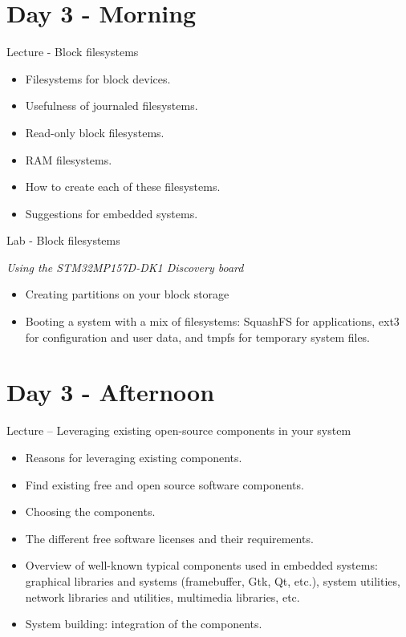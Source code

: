 \documentclass[a4paper,12pt,obeyspaces,spaces,hyphens]{article}
\begin{document}
\section{Day 3 - Morning}

\feagendatwocolumn
{Lecture - Block filesystems}
{
  \begin{itemize}
  \item Filesystems for block devices.
  \item Usefulness of journaled filesystems.
  \item Read-only block filesystems.
  \item RAM filesystems.
  \item How to create each of these filesystems.
  \item Suggestions for embedded systems.
  \end{itemize}
}
{Lab - Block filesystems}
{
  {\em Using the STM32MP157D-DK1 Discovery board}
  \begin{itemize}
  \item Creating partitions on your block storage
  \item Booting a system with a mix of filesystems: SquashFS for
	applications, ext3 for configuration and user data, and
	tmpfs for temporary system files.
  \end{itemize}
}

\section{Day 3 - Afternoon}

\feagendaonecolumn
{Lecture – Leveraging existing open-source components in your system}
{
  \begin{itemize}
  \item Reasons for leveraging existing components.
  \item Find existing free and open source software components.
  \item Choosing the components.
  \item The different free software licenses and their requirements.
  \item Overview of well-known typical components used in
        embedded systems: graphical libraries and systems
        (framebuffer, Gtk, Qt, etc.), system utilities,
        network libraries and utilities, multimedia libraries, etc.
  \item System building: integration of the components.
  \end{itemize}
}
\end{document}

